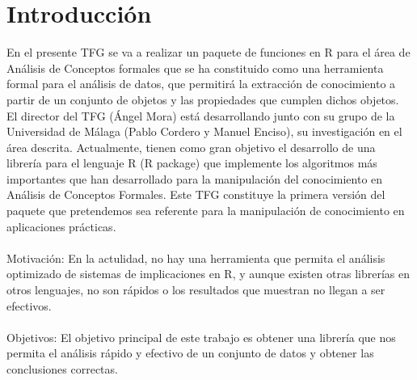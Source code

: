 \section{Introducci\'on}

En el presente TFG se va a realizar un paquete de funciones en 
R para el \'area de An\'alisis de Conceptos formales que se ha 
constituido como una herramienta formal para el an\'alisis de datos, 
que permitir\'a la extracci\'on de conocimiento a partir de un 
conjunto de objetos y las propiedades que cumplen dichos objetos.
\\
El director del TFG (\'Angel Mora) est\'a desarrollando junto 
con su grupo de la Universidad de M\'alaga (Pablo Cordero y Manuel 
Enciso), su investigaci\'on en el \'area descrita. Actualmente, 
tienen como gran objetivo el desarrollo de una librer\'ia para el 
lenguaje R (R package) que implemente los algoritmos m\'as 
importantes que han desarrollado para la manipulaci\'on del 
conocimiento en An\'alisis de Conceptos Formales. Este TFG 
constituye la primera versi\'on del paquete que pretendemos sea 
referente para la manipulaci\'on de conocimiento en aplicaciones 
pr\'acticas.
\\
\\
Motivaci\'on:
En la actulidad, no hay una herramienta que permita el an\'alisis 
optimizado de sistemas de implicaciones en R, y aunque existen otras 
librer\'ias en otros lenguajes, no son r\'apidos o los resultados que 
muestran no llegan a ser efectivos.
\\
\\
Objetivos:
El objetivo principal de este trabajo es obtener una librer\'ia que 
nos permita el an\'alisis r\'apido y efectivo de un conjunto de datos 
y obtener las conclusiones correctas.
\\
\\


\newpage
\thispagestyle{empty}
\mbox{}

\newpage
